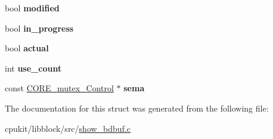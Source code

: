 \begin{DoxyCompactItemize}
bool {\bfseries modified}
\item 
\mbox{\label{structshow__bdbuf__bdbuf__info__t_a365e8946b12dbd897af0c56fe1cd6843}} 
bool {\bfseries in\+\_\+progress}
\item 
\mbox{\label{structshow__bdbuf__bdbuf__info__t_a84a3b9aa62e4f770f9b3e6207b40f88d}} 
bool {\bfseries actual}
\item 
\mbox{\label{structshow__bdbuf__bdbuf__info__t_a4de7e15ebba44dc37c5cb889e600dea7}} 
int {\bfseries use\+\_\+count}
\item 
\mbox{\label{structshow__bdbuf__bdbuf__info__t_a684d812220e4b0bba7c1864966b2299c}} 
const \mbox{\hyperlink{structCORE__mutex__Control}{C\+O\+R\+E\+\_\+mutex\+\_\+\+Control}} $\ast$ {\bfseries sema}
\end{DoxyCompactItemize}


The documentation for this struct was generated from the following file\+:\begin{DoxyCompactItemize}
\item 
cpukit/libblock/src/\mbox{\hyperlink{show__bdbuf_8c}{show\+\_\+bdbuf.\+c}}\end{DoxyCompactItemize}

